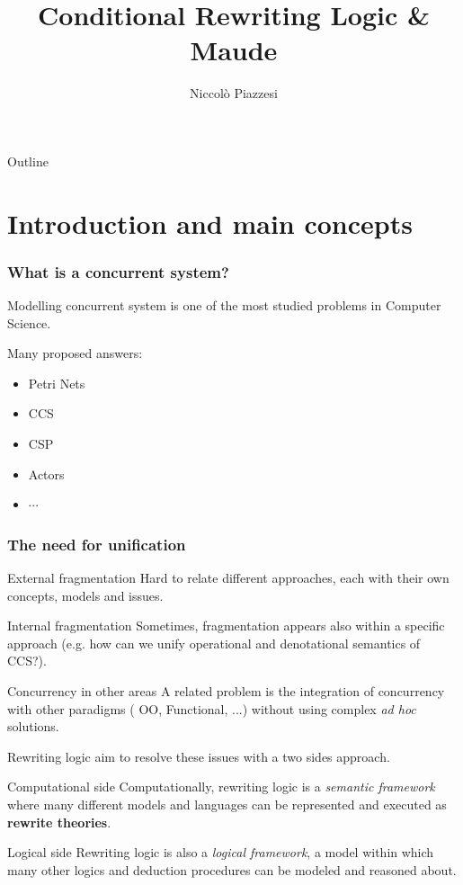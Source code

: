 \documentclass{beamer}
\title{Conditional Rewriting Logic \& Maude}
\author{Niccolò Piazzesi}
\institute{
    Università degli studi di Pisa
}
\begin{document}
\frame{\titlepage}

\begin{frame}{Outline}
    \tableofcontents[hideallsubsections]
\end{frame}
\section{Introduction and main concepts}
\begin{frame}
    \frametitle{What is a concurrent system?}
    Modelling concurrent system is one of the most studied problems in Computer Science.

    \bigskip
    \pause
    Many proposed answers:\begin{itemize}
        \item Petri Nets 
        \item CCS
        \item CSP 
        \item Actors
        \item $\cdots$
    \end{itemize}
\end{frame}
\begin{frame}
    \frametitle{The need for unification}
    \pause
        \begin{block}{External fragmentation}
            Hard to relate different approaches, each with their own concepts, models and issues.
        \end{block}
    \pause 
    \begin{block}{Internal fragmentation}
        Sometimes, fragmentation appears also within a specific approach (e.g. how can we unify operational and denotational semantics of CCS?).
    \end{block}
    \pause
    \begin{block}{Concurrency in other areas}
        A related problem is the integration of concurrency with other paradigms ( OO, Functional, ...)
        without using complex \emph{ad hoc} solutions.
    \end{block}
\end{frame}

\begin{frame}
    
    Rewriting logic aim to resolve these issues with a two sides approach.
    \pause
    \begin{block}{Computational side}
        Computationally, rewriting logic is a \emph{semantic framework} where many different 
        models and languages can be represented and executed as \textbf{rewrite theories}. 
    \end{block}
    \pause
    \begin{block}{Logical side}
        Rewriting logic  is also a \emph{logical framework}, a model within which 
        many other logics and deduction procedures  can be modeled and reasoned about.        
    \end{block}
\end{frame}
\end{document}
